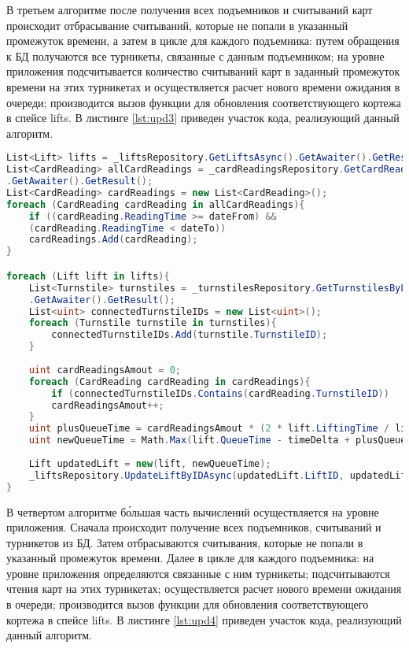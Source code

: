 В третьем алгоритме после получения всех подъемников и считываний карт происходит отбрасывание считываний, которые не попали в указанный промежуток времени, а затем в цикле для каждого подъемника: путем обращения к БД получаются все турникеты, связанные с данным подъемником; на уровне приложения подсчитывается количество считываний карт в заданный промежуток времени на этих турникетах и осуществляется расчет нового времени ожидания в очереди; производится вызов функции для обновления соответствующего кортежа в спейсе lifts. В листинге \ref{lst:upd3} приведен участок кода, реализующий данный алгоритм.

\clearpage
\captionsetup{justification=centering,singlelinecheck=off}
\begin{lstlisting}[label=lst:upd3, caption=Третий алгоритм обновления времени ожидания в очередях к подъемникам, language=csharp]
    List<Lift> lifts = _liftsRepository.GetLiftsAsync().GetAwaiter().GetResult();
List<CardReading> allCardReadings = _cardReadingsRepository.GetCardReadingsAsync()
.GetAwaiter().GetResult();
List<CardReading> cardReadings = new List<CardReading>();
foreach (CardReading cardReading in allCardReadings){
	if ((cardReading.ReadingTime >= dateFrom) &&
	(cardReading.ReadingTime < dateTo))
	cardReadings.Add(cardReading);
}

foreach (Lift lift in lifts){
	List<Turnstile> turnstiles = _turnstilesRepository.GetTurnstilesByLiftIdAsync(lift.LiftID)
	.GetAwaiter().GetResult();
	List<uint> connectedTurnstileIDs = new List<uint>();
	foreach (Turnstile turnstile in turnstiles){
		connectedTurnstileIDs.Add(turnstile.TurnstileID);
	}
	
	uint cardReadingsAmout = 0;
	foreach (CardReading cardReading in cardReadings){
		if (connectedTurnstileIDs.Contains(cardReading.TurnstileID))
		cardReadingsAmout++;
	}
	uint plusQueueTime = cardReadingsAmout * (2 * lift.LiftingTime / lift.SeatsAmount);
	uint newQueueTime = Math.Max(lift.QueueTime - timeDelta + plusQueueTime, 0);
	
	Lift updatedLift = new(lift, newQueueTime);
	_liftsRepository.UpdateLiftByIDAsync(updatedLift.LiftID, updatedLift.LiftName, updatedLift.IsOpen, updatedLift.SeatsAmount, updatedLift.LiftingTime).GetAwaiter().GetResult();
}
\end{lstlisting}


В четвертом алгоритме б\'{о}льшая часть вычислений осуществляется на уровне приложения. Сначала происходит получение всех подъемников, считываний и турникетов из БД. Затем отбрасываются считывания, которые не попали в указанный промежуток времени. Далее в цикле для каждого подъемника: на уровне приложения определяются связанные с ним турникеты; подсчитываются чтения карт на этих турникетах; осуществляется расчет нового времени ожидания в очереди; производится вызов функции для обновления соответствующего кортежа в спейсе lifts. В листинге \ref{lst:upd4} приведен участок кода, реализующий данный алгоритм.

